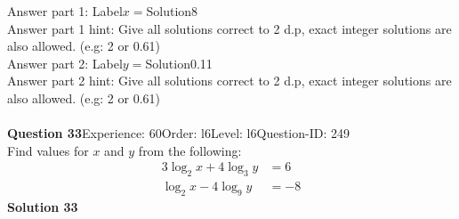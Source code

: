 \documentclass{article}
\begin{document}
Answer part 1: \hspace{10pt}Label\hspace{10pt}$x=$\hspace{10pt}Solution\hspace{10pt}8\\
Answer part 1 hint: \hspace{15pt}Give all solutions correct to 2 d.p, exact integer solutions are also allowed. (e.g: 2 or 0.61)\\
Answer part 2: \hspace{10pt}Label\hspace{10pt}$y=$\hspace{10pt}Solution\hspace{10pt}0.11\\
Answer part 2 hint: \hspace{15pt}Give all solutions correct to 2 d.p, exact integer solutions are also allowed. (e.g: 2 or 0.61)\\
\\[4pt]
\noindent\textbf{Question 33}\hspace{20pt}Experience: 60\hspace{20pt}Order: l6\hspace{20pt}Level: l6\hspace{20pt}Question-ID: 249\\[2pt]
Find values for $x$ and $y$ from the following:
\begin{align*}
3\log_{2}x+4\log_{3}y&=6\\[2pt]
\log_{2}x-4\log_{9}y&=-8
\end{align*}
\noindent\textbf{Solution 33}\\[2pt]
\end{document}
